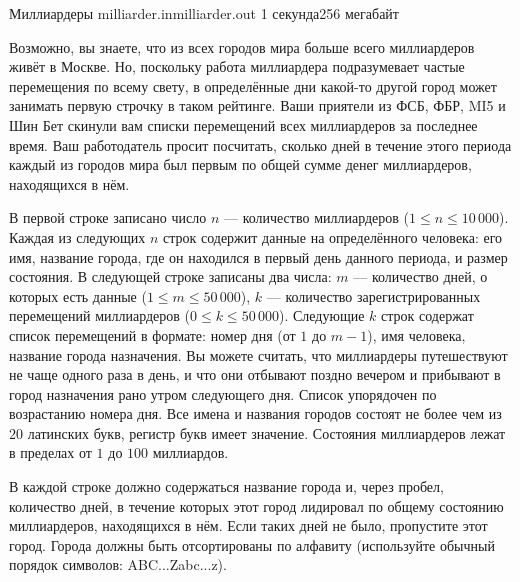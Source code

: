 
\begin{problem}{Миллиардеры}
{milliarder.in}{milliarder.out}
{1 секунда}{256 мегабайт}{}

Возможно, вы знаете, что из всех городов мира больше всего миллиардеров живёт в Москве.
Но, поскольку работа миллиардера подразумевает частые перемещения по всему свету,
в определённые дни какой-то другой город может занимать первую строчку в таком рейтинге.
Ваши приятели из ФСБ, ФБР, MI5 и Шин Бет скинули вам списки перемещений всех миллиардеров за последнее время.
Ваш работодатель просит посчитать, сколько дней в течение этого периода каждый из городов
мира был первым по общей сумме денег миллиардеров, находящихся в нём.

\InputFile

В первой строке записано число $n$  --- количество миллиардеров 
($1 \le n \le 10\,000$). Каждая из следующих $n$ строк содержит данные на определённого человека:
его имя, название города, где он находился в первый день данного периода, и размер состояния.
В следующей строке записаны два числа: $m$ --- количество дней, о которых есть данные ($1 \le m \le 50\,000$),
$k$ --- количество зарегистрированных перемещений миллиардеров ($0 \le k \le 50\,000$).
Следующие $k$ строк содержат список перемещений в формате: номер дня (от $1$ до $m{-}1$),
имя человека, название города назначения. Вы можете считать, что миллиардеры путешествуют не чаще одного раза в день,
и что они отбывают поздно вечером и прибывают в город назначения рано утром следующего дня.
Список упорядочен по возрастанию номера дня. Все имена и названия городов состоят не более чем из $20$ латинских букв,
регистр букв имеет значение. Состояния миллиардеров лежат в пределах от $1$ до $100$ миллиардов. 

\OutputFile

В каждой строке должно содержаться название города и, через пробел,
количество дней, в течение которых этот город лидировал по общему состоянию
миллиардеров, находящихся в нём. Если таких дней не было, пропустите этот
город. Города должны быть отсортированы по алфавиту
(используйте обычный порядок символов: ABC...Zabc...z).

\Examples

\begin{example}
%
\end{example}

\end{problem}
